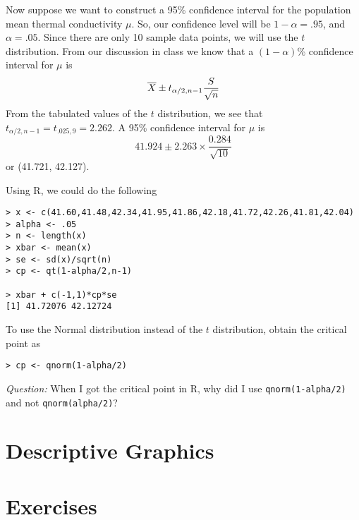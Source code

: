 Now suppose we want to construct a 95\% confidence interval for the
population mean thermal conductivity $\mu$. So, our confidence level
will be $1-\alpha=.95$, and $\alpha=.05$. Since there are only 10
sample data points, we will use the $t$ distribution. From our
discussion in class we know that a $(1-\alpha)$\% confidence interval
for $\mu$ is
\[ \overline{X} \pm t_{\alpha/2,n-1}\frac{S}{\sqrt{n}} \]
From the tabulated values of the $t$ distribution, we see that
$t_{\alpha/2,n-1} = t_{.025,9} = 2.262$. A 95\% confidence interval for $\mu$ is
\[  41.924 \pm 2.263 \times \frac{0.284}{\sqrt{10}} \]
or (41.721, 42.127).

Using R, we could do the following

\vspace{.1in}
\begin{Verbatim}[samepage=true]
> x <- c(41.60,41.48,42.34,41.95,41.86,42.18,41.72,42.26,41.81,42.04)
> alpha <- .05
> n <- length(x)
> xbar <- mean(x)
> se <- sd(x)/sqrt(n)
> cp <- qt(1-alpha/2,n-1)

> xbar + c(-1,1)*cp*se
[1] 41.72076 42.12724
\end{Verbatim}
\vspace{.1in}
To use the Normal distribution instead of the $t$ distribution, obtain the
critical point as
\begin{Verbatim}
> cp <- qnorm(1-alpha/2)
\end{Verbatim}

\emph{Question:} When I got the critical point in R, why did I use
\texttt{qnorm(1-alpha/2)} and not \texttt{qnorm(alpha/2)}?

\section{Descriptive Graphics}

\section{Exercises}

